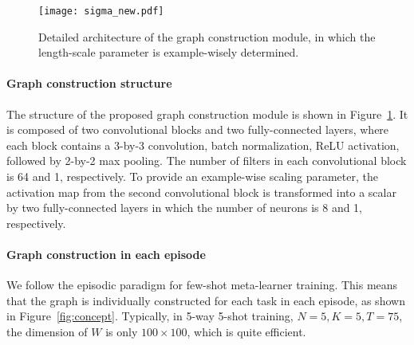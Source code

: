 \documentclass{article} \usepackage{iclr2019_conference,times}
\begin{document}
\begin{figure}[ht]
  \centering
  \texttt{[image: sigma\_new.pdf]}
  \caption{Detailed architecture of the graph construction module, 
  in which the length-scale parameter is example-wisely determined.}
  \label{construct}
\end{figure}

\paragraph{Graph construction structure} The structure of the proposed graph construction module is shown in Figure~\ref{construct}. It is composed of two convolutional blocks and two fully-connected layers, where each block contains a 3-by-3 convolution, batch normalization, ReLU activation, followed by 2-by-2 max pooling. The number of filters in each convolutional block is 64 and 1, respectively. To provide an example-wise scaling parameter, the activation map from the second convolutional block is transformed into a scalar by two fully-connected layers in which the number of neurons is 8 and 1, respectively.

\paragraph{Graph construction in each episode} We follow the episodic paradigm for few-shot meta-learner training. This means that the graph is individually constructed for each task in each episode, as shown in Figure~\ref{fig:concept}. Typically, in 5-way 5-shot training, $N=5, K=5, T=75$, the dimension of $W$ is only $100\times 100$, which is quite efficient. 
\end{document}
